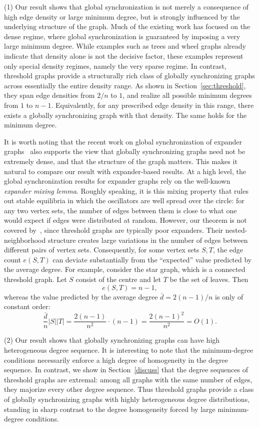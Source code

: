 \documentclass[11pt,reqno]{amsart}
\theoremstyle{definition}
\begin{document}
\noindent
(1) Our result shows that global synchronization is not merely a consequence of
high edge density or large minimum degree, but is strongly influenced by the
underlying structure of the graph. Much of the existing work has focused on the
dense regime, where global synchronization is guaranteed by imposing a very large
minimum degree. While examples such as trees and wheel graphs already indicate
that density alone is not the decisive factor, these examples represent only
special density regimes, namely the very sparse regime. In contrast, threshold
graphs provide a structurally rich class of globally synchronizing graphs across
essentially the entire density range. As shown in Section~\ref{sec:threshold},
they span edge densities from \(2/n\) to \(1\), and realize all possible minimum
degrees from \(1\) to \(n-1\). Equivalently, for any prescribed edge density in
this range, there exists a globally synchronizing graph with that density. The
same holds for the minimum degree.

It is worth noting that the recent work on global synchronization of expander
graphs~\cite{abdalla2026expander} also supports the view that globally
synchronizing graphs need not be extremely dense, and that the structure of the
graph matters. This makes it natural to compare our result with expander-based
results.
At a high level, the global synchronization results for expander graphs rely on
the well-known \textit{expander mixing lemma}. Roughly speaking, it is this
mixing property that rules out stable equilibria in which the oscillators are
well spread over the circle: for any two vertex sets, the number of edges between
them is close to what one would expect if edges were distributed at random.
However, our theorem is not covered by~\cite{abdalla2026expander}, since
threshold graphs are typically poor expanders. Their nested-neighborhood
structure creates large variations in the number of edges between different
pairs of vertex sets. Consequently, for some vertex sets \(S,T\), the edge count
\(e(S,T)\) can deviate substantially from the ``expected'' value predicted by the
average degree. For example, consider the star graph, which is a connected
threshold graph. Let \(S\) consist of the centre and let \(T\) be the set of
leaves. Then
\[
e(S,T)=n-1,
\]
whereas the value predicted by the average degree \(\bar d=2(n-1)/n\) is only of constant order:
\[
\frac{\bar d}{n}|S||T|
=
\frac{2(n-1)}{n^2}\cdot (n-1)
=
\frac{2(n-1)^2}{n^2}
=O(1).
\]

\noindent
(2) Our result shows that globally synchronizing graphs can have high heterogeneous degree sequence. It is interesting to note that the minimum-degree conditions necessarily enforce a high degree of homogeneity in the degree sequence. In contrast, we show in Section~\ref{discuss} that the degree sequences of threshold graphs are extremal: among all graphs with the same number of edges, they majorize every other degree sequence. Thus threshold graphs provide a class of globally synchronizing graphs with highly heterogeneous degree distributions, standing in sharp contrast to the degree homogeneity forced by large minimum-degree conditions.
\newline
\end{document}
